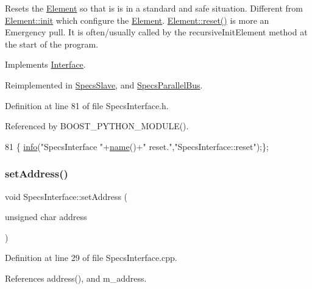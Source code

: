 Resets the \hyperlink{classElement}{Element} so that is is in a standard and safe situation. Different from \hyperlink{classElement_af42754b5cabc198869222725218d695c}{Element\+::init} which configure the \hyperlink{classElement}{Element}. \hyperlink{classElement_a69efffa22f06909d768149715565cb56}{Element\+::reset()} is more an Emergency pull. It is often/usually called by the recursive\+Init\+Element method at the start of the program. 

Implements \hyperlink{classInterface_a4d44329cea9981a9e0392eaaf99efadd}{Interface}.



Reimplemented in \hyperlink{classSpecsSlave_a6c69baff5941cabed2947f547041bbeb}{Specs\+Slave}, and \hyperlink{classSpecsParallelBus_af8e41f6efecc8d65cf7d7a884a33d4ee}{Specs\+Parallel\+Bus}.



Definition at line 81 of file Specs\+Interface.\+h.



Referenced by B\+O\+O\+S\+T\+\_\+\+P\+Y\+T\+H\+O\+N\+\_\+\+M\+O\+D\+U\+L\+E().


\begin{DoxyCode}
81 \{ \hyperlink{classObject_a644fd329ea4cb85f54fa6846484b84a8}{info}(\textcolor{stringliteral}{"SpecsInterface "}+\hyperlink{classObject_a300f4c05dd468c7bb8b3c968868443c1}{name}()+\textcolor{stringliteral}{" reset."},\textcolor{stringliteral}{"SpecsInterface::reset"});\};
\end{DoxyCode}
\mbox{\label{classSpecsInterface_aa92dff67cc80487ee3109b6aee2fa007}} 
\subsubsection{\texorpdfstring{set\+Address()}{setAddress()}}
{\footnotesize\ttfamily void Specs\+Interface\+::set\+Address (\begin{DoxyParamCaption}\item[{unsigned char}]{address }\end{DoxyParamCaption})}



Definition at line 29 of file Specs\+Interface.\+cpp.



References address(), and m\+\_\+address.



